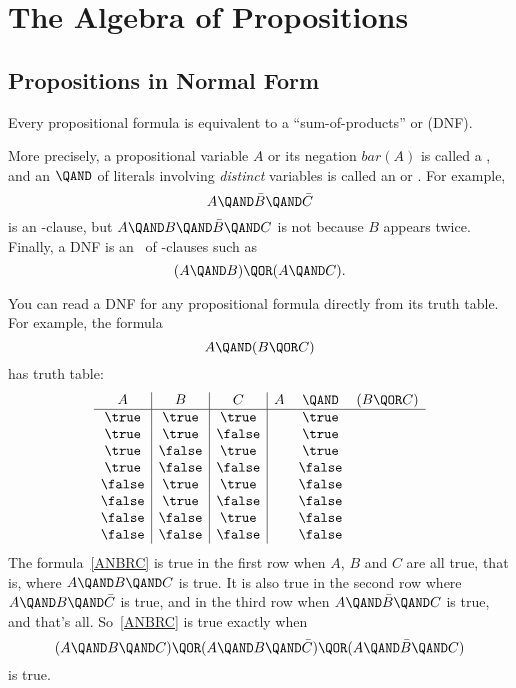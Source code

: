 \section{The Algebra of Propositions}\label{prop_algebra_sec}

\subsection{Propositions in Normal Form}\label{normal_form_sec}
Every propositional formula is equivalent to a ``sum-of-products'' or
 (DNF). 

More precisely, a propositional variable $A$ or its negation $bar(A)$
is called a , and an $\QAND$ of literals involving
\emph{distinct} variables is called an  or
.  For example,
\[
A \QAND \bar{B} \QAND \bar{C}
\]
is an \QAND-clause, but $A \QAND B \QAND \bar{B} \QAND C$ is not
because $B$ appears twice.  Finally, a DNF is an \QOR\ of \QAND-clauses such as
\begin{equation}\label{ANBOANC}
(A \QAND B) \QOR (A \QAND C).
\end{equation}

You can read a DNF for any propositional formula directly
from its truth table.  For example, the formula
\begin{equation}\label{ANBRC}
A \QAND (B \QOR C)
\end{equation}
has truth table:
\[\begin{array}{c|c|c|ccc}
A      & B      & C       & A & \QAND & (B \QOR C)\label{ANBRCTT}\\
\hline \true  & \true  & \true   &   &  \true\\
\true  & \true  & \false  &   &  \true\\
\true  & \false & \true   &   &  \true\\
\true  & \false & \false  &   &  \false\\
\false & \true  & \true   &   &  \false\\
\false & \true  & \false  &   &  \false\\
\false & \false & \true   &   &  \false\\
\false & \false & \false  &   &  \false
\end{array}\]
The formula~\eqref{ANBRC} is true in the first row when $A$, $B$ and
$C$ are all true, that is, where $A \QAND B \QAND C$ is true.  It is
also true in the second row where $A \QAND B \QAND \bar{C}$ is true,
and in the third row when $A \QAND \bar{B} \QAND C$ is true, and
that's all.  So~\eqref{ANBRC} is true exactly when
\begin{equation}\label{ABCDNF}
(A \QAND B \QAND C) \QOR (A \QAND B \QAND \bar{C}) \QOR
  (A \QAND \bar{B} \QAND C)
\end{equation}
is true.

